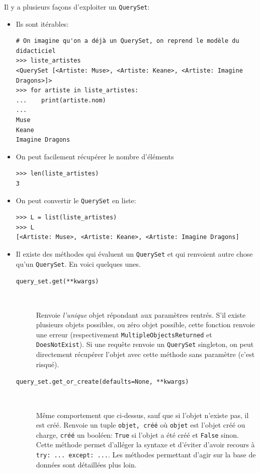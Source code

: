 \documentclass[a4paper, 10pt]{article}
\begin{document}
Il y a plusieurs façons d'exploiter un \texttt{QuerySet}:
\begin{itemize}
    \item Ils sont itérables:
          \begin{verbatim}
# On imagine qu'on a déjà un QuerySet, on reprend le modèle du didacticiel
>>> liste_artistes
<QuerySet [<Artiste: Muse>, <Artiste: Keane>, <Artiste: Imagine Dragons>]>
>>> for artiste in liste_artistes:
...    print(artiste.nom)
...
Muse
Keane
Imagine Dragons
    \end{verbatim}

    \item On peut facilement récupérer le nombre d'éléments
          \begin{verbatim}
>>> len(liste_artistes)
3
    \end{verbatim}

    \item On peut convertir le \texttt{QuerySet} en liste:
          \begin{verbatim}
>>> L = list(liste_artistes)
>>> L
[<Artiste: Muse>, <Artiste: Keane>, <Artiste: Imagine Dragons]
    \end{verbatim}

    \item Il existe des méthodes qui évaluent un \texttt{QuerySet} et qui renvoient autre chose qu'un \texttt{QuerySet}. En voici quelques unes.

          \begin{description}
              \item[\texttt{query_set.get(**kwargs)}]~

                    Renvoie \emph{l'unique} objet répondant aux paramètres rentrés. S'il existe plusieurs objets possibles, ou zéro objet possible, cette fonction renvoie une erreur (respectivement \texttt{MultipleObjectsReturned} et \texttt{DoesNotExist}). Si une requête renvoie un \texttt{QuerySet} singleton, on peut directement récupérer l'objet avec cette méthode sans paramètre (c'est risqué).

              \item[\texttt{query_set.get_or_create(defaults=None, **kwargs)}]~

                    Même comportement que ci-dessus, sauf que si l'objet n'existe pas, il est créé. Renvoie un tuple \texttt{objet, créé} où \texttt{objet} est l'objet créé ou charge, \texttt{créé} un booléen: \texttt{True} si l'objet a été créé et \texttt{False} sinon. Cette méthode permet d'alléger la syntaxe et d'éviter d'avoir recours à \texttt{try: ... except: ...}. Les méthodes permettant d'agir sur la base de données sont détaillées plus loin.


\end{description}
\end{itemize}
\end{document}
